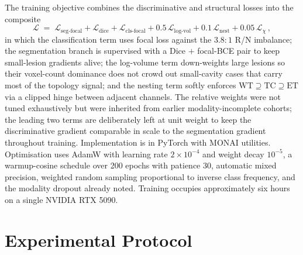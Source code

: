 \documentclass[11pt,a4paper]{article}
\begin{document}
The training objective combines the discriminative and structural losses into the composite
\begin{equation}
\mathcal{L} \;=\; \mathcal{L}_{\text{seg-focal}} + \mathcal{L}_{\text{dice}} + \mathcal{L}_{\text{cls-focal}} + 0.5\,\mathcal{L}_{\text{log-vol}} + 0.1\,\mathcal{L}_{\text{nest}} + 0.05\,\mathcal{L}_\chi \,,
\label{eq:loss}
\end{equation}
in which the classification term uses focal loss against the $3.8\!:\!1$ R/N imbalance; the segmentation branch is supervised with a Dice $+$ focal-BCE pair to keep small-lesion gradients alive; the log-volume term down-weights large lesions so their voxel-count dominance does not crowd out small-cavity cases that carry most of the topology signal; and the nesting term softly enforces $\text{WT}\supseteq\text{TC}\supseteq\text{ET}$ via a clipped hinge between adjacent channels. The relative weights were not tuned exhaustively but were inherited from earlier modality-incomplete cohorts; the leading two terms are deliberately left at unit weight to keep the discriminative gradient comparable in scale to the segmentation gradient throughout training. Implementation is in PyTorch with MONAI utilities. Optimisation uses AdamW with learning rate $2\times 10^{-4}$ and weight decay $10^{-5}$, a warmup-cosine schedule over 200 epochs with patience 30, automatic mixed precision, weighted random sampling proportional to inverse class frequency, and the modality dropout already noted. Training occupies approximately six hours on a single NVIDIA RTX 5090.

\section{Experimental Protocol}
\end{document}
